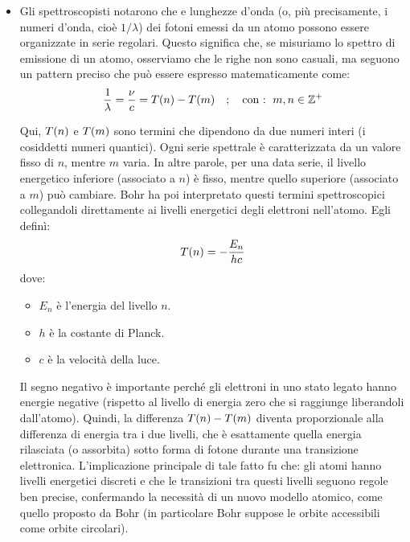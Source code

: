 \begin{itemize}
	\item Gli spettroscopisti notarono che e lunghezze d'onda (o, più precisamente, i numeri d'onda, cioè $1/\lambda$) dei fotoni emessi da un atomo possono essere organizzate in serie regolari. Questo significa che, se misuriamo lo spettro di emissione di un atomo, osserviamo che le righe non sono casuali, ma seguono un pattern preciso che può essere espresso matematicamente come:
	\begin{align*}
		\frac{1}{\lambda} = \frac{\nu}{c} = T\qty(n) - T\qty(m) \quad ; \quad \text{con : } \, m, n \in \mathbb{Z}^+
	\end{align*} 
		
		Qui, $T\qty(n)$ e $T\qty(m)$ sono termini che dipendono da due numeri interi (i cosiddetti numeri quantici). Ogni serie spettrale è caratterizzata da un valore fisso di $n$, mentre $m$ varia. In altre parole, per una data serie, il livello energetico inferiore (associato a $n$) è fisso, mentre quello superiore (associato a $m$) può cambiare. Bohr ha poi interpretato questi termini spettroscopici collegandoli direttamente ai livelli energetici degli elettroni nell'atomo. Egli definì:
	\begin{align*}
		T\qty(n) = - \frac{E_n}{hc}
	\end{align*}
		dove:
	\begin{itemize}
		\item $E_n$ è l'energia del livello $n$.
		\item $h$ è la costante di Planck.
		\item $c$ è la velocità della luce.
	\end{itemize}
		Il segno negativo è importante perché gli elettroni in uno stato legato hanno energie negative (rispetto al livello di energia zero che si raggiunge liberandoli dall'atomo). Quindi, la differenza $T\qty(n) - T\qty(m)$ diventa proporzionale alla differenza di energia tra i due livelli, che è esattamente quella energia rilasciata (o assorbita) sotto forma di fotone durante una transizione elettronica. L'implicazione principale di tale fatto fu che: gli atomi hanno livelli energetici discreti e che le transizioni tra questi livelli seguono regole ben precise, confermando la necessità di un nuovo modello atomico, come quello proposto da Bohr (in particolare Bohr suppose le orbite accessibili come orbite circolari).
		
\end{itemize}
	
